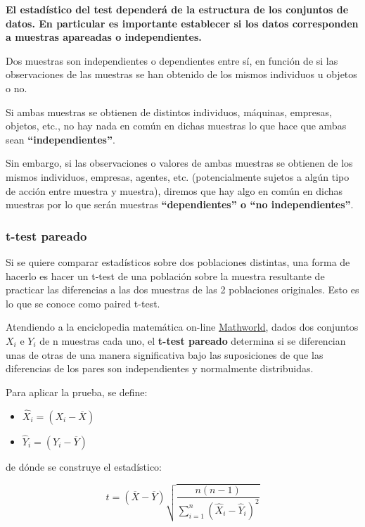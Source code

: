 \documentclass[11pt]{article}
\providecommand{\tightlist}{%
      \setlength{\itemsep}{0pt}\setlength{\parskip}{0pt}}
\begin{document}
\textbf{El estadístico del test dependerá de la estructura de los
conjuntos de datos. En particular es importante establecer si los datos
corresponden a muestras apareadas o independientes.}

Dos muestras son independientes o dependientes entre sí, en función de
si las observaciones de las muestras se han obtenido de los mismos
individuos u objetos o no.

Si ambas muestras se obtienen de distintos individuos, máquinas,
empresas, objetos, etc., no hay nada en común en dichas muestras lo que
hace que ambas sean \textbf{``independientes''}.

Sin embargo, si las observaciones o valores de ambas muestras se
obtienen de los mismos individuos, empresas, agentes, etc.
(potencialmente sujetos a algún tipo de acción entre muestra y muestra),
diremos que hay algo en común en dichas muestras por lo que serán
muestras \textbf{``dependientes'' o ``no independientes''}.

\subsubsection{t-test pareado}\label{t-test-pareado}

Si se quiere comparar estadísticos sobre dos poblaciones distintas, una
forma de hacerlo es hacer un t-test de una población sobre la muestra
resultante de practicar las diferencias a las dos muestras de las 2
poblaciones originales. Esto es lo que se conoce como paired t-test.

Atendiendo a la enciclopedia matemática on-line
\href{http://mathworld.wolfram.com/Pairedt-Test.html}{Mathworld}, dados
dos conjuntos \(X_i\) e \(Y_i\) de n muestras cada uno, el
\textbf{t-test pareado} determina si se diferencian unas de otras de una
manera significativa bajo las suposiciones de que las diferencias de los
pares son independientes y normalmente distribuidas.

Para aplicar la prueba, se define:

\begin{itemize}
\tightlist
\item
  \(\hat{X}_{i} = (X_{i} - \overline{X})\)
\item
  \(\hat{Y}_{i} = (Y_{i} - \overline{Y})\)
\end{itemize}

de dónde se construye el estadístico:

\[t = (\overline{X} - \overline{Y}) \sqrt{\frac{n (n-1)}{\sum_{i=1}^n (\hat{X}_{i} - \hat{Y}_{i})^2}}\]
\end{document}

